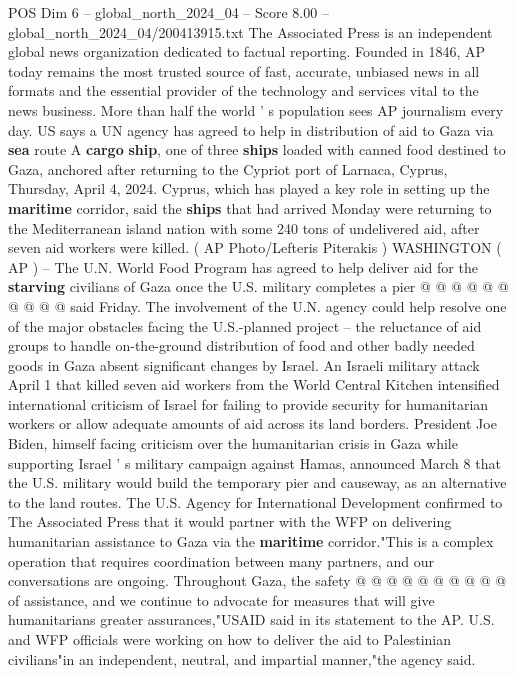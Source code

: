 \begin{textsample}{POS Dim 6 – global\_north\_2024\_04 – Score 8.00 – global\_north\_2024\_04/200413915.txt}  \label{ex:f6_pos_114}
The Associated Press is an independent global news organization dedicated to factual reporting.
Founded in 1846, AP today remains the most trusted source of fast, accurate, unbiased news in all formats and the essential provider of the technology and services vital to the news business.
More than half the world ' s population sees AP journalism every day.
US says a UN agency has agreed to help in distribution of aid to Gaza via \textbf{sea} route A \textbf{cargo} \textbf{ship}, one of three \textbf{ships} loaded with canned food destined to Gaza, anchored after returning to the Cypriot port of Larnaca, Cyprus, Thursday, April 4, 2024.
Cyprus, which has played a key role in setting up the \textbf{maritime} corridor, said the \textbf{ships} that had arrived Monday were returning to the Mediterranean island nation with some 240 tons of undelivered aid, after seven aid workers were killed. ( AP Photo/Lefteris Piterakis ) WASHINGTON ( AP ) -- The U.N.
World Food Program has agreed to help deliver aid for the \textbf{starving} civilians of Gaza once the U.S. military completes a pier @ @ @ @ @ @ @ @ @ @ said Friday.
The involvement of the U.N. agency could help resolve one of the major obstacles facing the U.S.-planned project -- the reluctance of aid groups to handle on-the-ground distribution of food and other badly needed goods in Gaza absent significant changes by Israel.
An Israeli military attack April 1 that killed seven aid workers from the World Central Kitchen intensified international criticism of Israel for failing to provide security for humanitarian workers or allow adequate amounts of aid across its land borders.
President Joe Biden, himself facing criticism over the humanitarian crisis in Gaza while supporting Israel ' s military campaign against Hamas, announced March 8 that the U.S. military would build the temporary pier and causeway, as an alternative to the land routes.
The U.S.
Agency for International Development confirmed to The Associated Press that it would partner with the WFP on delivering humanitarian assistance to Gaza via the \textbf{maritime} corridor."This is a complex operation that requires coordination between many partners, and our conversations are ongoing.
Throughout Gaza, the safety @ @ @ @ @ @ @ @ @ @ of assistance, and we continue to advocate for measures that will give humanitarians greater assurances,"USAID said in its statement to the AP.
U.S. and WFP officials were working on how to deliver the aid to Palestinian civilians"in an independent, neutral, and impartial manner,"the agency said.

\end{textsample}
